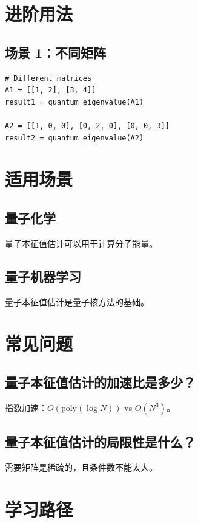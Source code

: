 \documentclass[12pt,a4paper]{article}
\begin{document}
\section{进阶用法}

\subsection{场景 1：不同矩阵}

\begin{lstlisting}[style=python]
# Different matrices
A1 = [[1, 2], [3, 4]]
result1 = quantum_eigenvalue(A1)

A2 = [[1, 0, 0], [0, 2, 0], [0, 0, 3]]
result2 = quantum_eigenvalue(A2)
\end{lstlisting}

\section{适用场景}

\subsection{量子化学}

量子本征值估计可以用于计算分子能量。

\subsection{量子机器学习}

量子本征值估计是量子核方法的基础。

\section{常见问题}

\subsection{量子本征值估计的加速比是多少？}

指数加速：$O(\text{poly}(\log N))$ vs $O(N^3)$。

\subsection{量子本征值估计的局限性是什么？}

需要矩阵是稀疏的，且条件数不能太大。

\section{学习路径}
\end{document}
